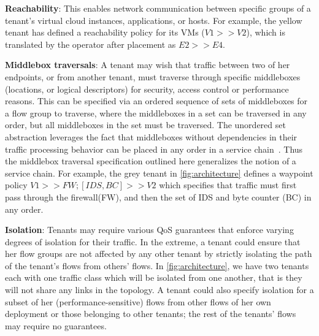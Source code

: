 \begin{compactitemize}
\item \textbf{Reachability}: This enables network communication
  between specific groups of a tenant's virtual cloud instances,
  applications, or hosts. For example, the yellow tenant has defined a reachability
  policy for its VMs ($V1 >> V2$), which is translated by the operator after 
  placement as $E2 >> E4$.
\item \textbf{Middlebox traversals}: A tenant may wish that traffic
  between two of her endpoints, or from another tenant, must traverse
  through specific middleboxes (locations, or logical descriptors) for
  security, access control or performance reasons. This can be
  specified via an ordered sequence of sets of middleboxes for a flow
  group to traverse, where the middleboxes in a set can be traversed
  in any order, but all middleboxes in the set must be traversed.  The
  unordered set abstraction leverages the fact that middleboxes
  without dependencies in their traffic processing behavior can be
  placed in any order in a service chain~\cite{pga}. Thus the
  middlebox traversal specification outlined here generalizes the
  notion of a service chain. For example, the grey tenant in \cref{fig:architecture}
  defines a waypoint policy $V1 >> FW; [IDS,BC] >> V2$
   which specifies that traffic must first pass through the firewall(FW),
  and then the set of IDS and byte counter (BC) in any order. 


\item \textbf{Isolation}: Tenants may require various QoS guarantees
  that enforce varying degrees of isolation for their traffic. In the
  extreme, a tenant could ensure that her flow groups are not affected
  by any other tenant by strictly isolating the path of the tenant's
  flows from others' flows. In \cref{fig:architecture}, we have two tenants
  each with one traffic class which will be isolated from one another, that is
  they will not share any links in the topology. 
  A tenant could also specify isolation for a subset of her
  (performance-sensitive) flows from other flows of her own deployment
  or those belonging to other tenants; the rest of the tenants' flows
  may require no guarantees.


\end{compactitemize}
